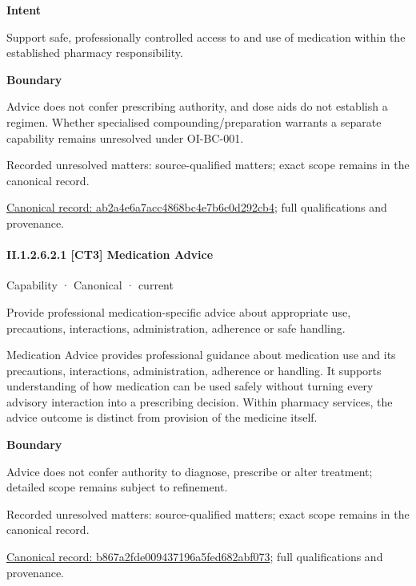 \textbf{Intent}



Support safe, professionally controlled access to and use of medication within the established pharmacy responsibility.



\textbf{Boundary}



Advice does not confer prescribing authority, and dose aids do not establish a regimen. Whether specialised compounding/preparation warrants a separate capability remains unresolved under OI-BC-001.


{\small Recorded unresolved matters: source-qualified matters; exact scope remains in the canonical record.}\par
{\footnotesize \href{../../../../continuum/strategy/capability/ab2a4e6a7acc4868bc4e7b6c0d292cb4.md}{Canonical record: ab2a4e6a7acc4868bc4e7b6c0d292cb4}; full qualifications and provenance.}\par
\paragraph*{II.1.2.6.2.1 [CT3] Medication Advice}
\label{navigation:II.1.2.6.2.1}

\label{element:b867a2fde009437196a5fed682abf073}
{\small Capability · Canonical · current}\par

Provide professional medication-specific advice about appropriate use, precautions, interactions, administration, adherence or safe handling.



Medication Advice provides professional guidance about medication use and its precautions, interactions, administration, adherence or handling. It supports understanding of how medication can be used safely without turning every advisory interaction into a prescribing decision. Within pharmacy services, the advice outcome is distinct from provision of the medicine itself.



\textbf{Boundary}



Advice does not confer authority to diagnose, prescribe or alter treatment; detailed scope remains subject to refinement.


{\small Recorded unresolved matters: source-qualified matters; exact scope remains in the canonical record.}\par
{\footnotesize \href{../../../../continuum/strategy/capability/b867a2fde009437196a5fed682abf073.md}{Canonical record: b867a2fde009437196a5fed682abf073}; full qualifications and provenance.}\par

